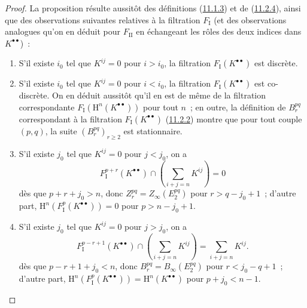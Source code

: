 \begin{proof}
La proposition résulte aussitôt des définitions
(\hyperref[0.11.1.3-fr]{11.1.3}) et de
(\hyperref[0.11.2.4-fr]{11.2.4}), ainsi que des observations suivantes
relatives à la filtration $F_{\mathrm I}$ (et des observations analogues qu'on
en déduit pour $F_{\mathrm{II}}$ en échangeant les rôles des deux indices
dans $K^{\bullet\bullet}$)~:
\begin{enumerate}
  \item[$1^\circ$] S'il existe $i_0$ tel que $K^{ij}=0$ pour $i>i_0$, la
    filtration $F_{\mathrm I}(K^{\bullet\bullet})$ est discrète.
  \item[$2^\circ$] S'il existe $i_0$ tel que $K^{ij}=0$ pour $i<i_0$, la
    filtration $F_{\mathrm I}(K^{\bullet\bullet})$ est co-discrète. On en
    déduit aussitôt qu'il en est de même de la filtration correspondante
    $F_{\mathrm I}(\mathrm H^n(K^{\bullet\bullet}))$ pour tout $n$~; en
    outre, la définition de $B_r^{pq}$ correspondant à la filtration
    $F_{\mathrm I}(K^{\bullet\bullet})$
    (\hyperref[0.11.2.2-fr]{11.2.2}) montre que pour tout couple $(p,q)$, la
    suite $(B_r^{pq})_{r\geq2}$ est stationnaire.
  \item[$3^\circ$] S'il existe $j_0$ tel que $K^{ij}=0$ pour $j<j_0$, on a
    \[
      F_{\mathrm I}^{p+r}(K^{\bullet\bullet})
      \cap\left(\sum_{i+j=n}K^{ij}\right)=0
    \]
    dès que $p+r+j_0>n$, donc
    $Z_r^{pq}=Z_\infty(E_2^{pq})$ pour $r>q-j_0+1$~; d'autre part,
    $\mathrm H^n(F_{\mathrm I}^p(K^{\bullet\bullet}))=0$ pour
    $p>n-j_0+1$.
  \item[$4^\circ$] S'il existe $j_0$ tel que $K^{ij}=0$ pour $j>j_0$, on a
    \[
      F_{\mathrm I}^{p-r+1}(K^{\bullet\bullet})
      \cap\left(\sum_{i+j=n}K^{ij}\right)=\sum_{i+j=n}K^{ij}.
    \]
    dès que $p-r+1+j_0<n$, donc
    $B_r^{pq}=B_\infty(E_2^{pq})$ pour $r<j_0-q+1$~; d'autre part,
    $\mathrm H^n(F_{\mathrm I}^p(K^{\bullet\bullet}))
    =\mathrm H^n(K^{\bullet\bullet})$ pour $p+j_0<n-1$.
\end{enumerate}
\end{proof}

